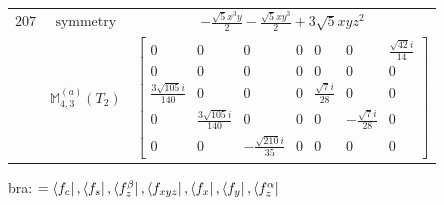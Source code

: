 \documentclass[fleqn,8pt,landscape]{jsarticle}
\begin{document}
\begin{longtable}{ccc}
$ 207 $ & $ \text{symmetry} $ & $ - \frac{\sqrt{5} x^{3} y}{2} - \frac{\sqrt{5} x y^{3}}{2} + 3 \sqrt{5} x y z^{2} $ \\
$  $ & $ \mathbb{M}_{4,3}^{(a)}(T_{2}) $ & $ \begin{bmatrix} 0 & 0 & 0 & 0 & 0 & 0 & \frac{\sqrt{42} i}{14} \\ 0 & 0 & 0 & 0 & 0 & 0 & 0 \\ \frac{3 \sqrt{105} i}{140} & 0 & 0 & 0 & \frac{\sqrt{7} i}{28} & 0 & 0 \\ 0 & \frac{3 \sqrt{105} i}{140} & 0 & 0 & 0 & - \frac{\sqrt{7} i}{28} & 0 \\ 0 & 0 & - \frac{\sqrt{210} i}{35} & 0 & 0 & 0 & 0 \end{bmatrix} $ \\ \hline
\end{longtable}
bra: $=\bra{f_{c}}, \bra{f_{s}}, \bra{f_{z}^{\beta}}, \bra{f_{xyz}}, \bra{f_{x}}, \bra{f_{y}}, \bra{f_{z}^{\alpha}}$
\end{document}
